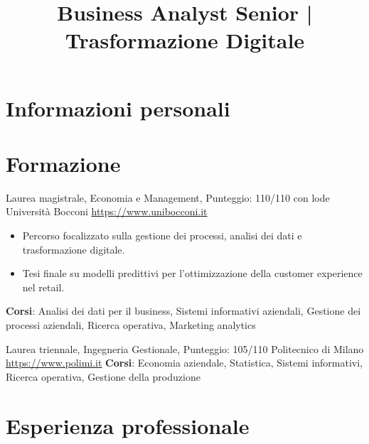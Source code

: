 \documentclass[a4paper, serif, 10pt]{moderncv}
\title{Business Analyst Senior | Trasformazione Digitale}
\begin{document}
\maketitle

\section{Informazioni personali}

\section{Formazione}

        {Laurea magistrale, Economia e Management, Punteggio: 110/110 con lode}
        {Università Bocconi}
        {\url{https://www.unibocconi.it}}
        {}
        {\begin{itemize}
\item Percorso focalizzato sulla gestione dei processi, analisi dei dati e trasformazione digitale.
\item Tesi finale su modelli predittivi per l'ottimizzazione della customer experience nel retail.
\end{itemize}
\textbf{Corsi}: Analisi dei dati per il business, Sistemi informativi aziendali, Gestione dei processi aziendali, Ricerca operativa, Marketing analytics}

        {Laurea triennale, Ingegneria Gestionale, Punteggio: 105/110}
        {Politecnico di Milano}
        {\url{https://www.polimi.it}}
        {}
        {\textbf{Corsi}: Economia aziendale, Statistica, Sistemi informativi, Ricerca operativa, Gestione della produzione}
\section{Esperienza professionale}
\end{document}
